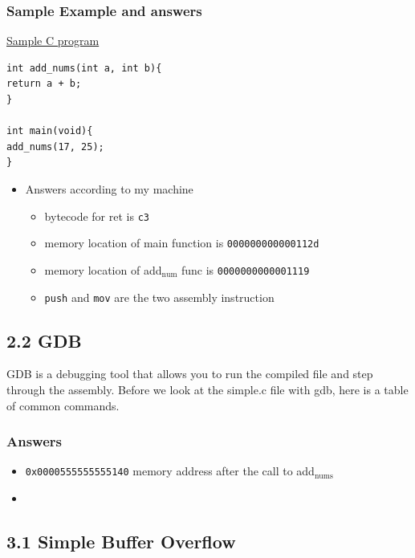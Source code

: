 \documentclass[11pt]{article}
\begin{document}
\subsubsection*{Sample Example and answers}
\label{sec:org05e3846}
\uline{Sample C program}
\begin{verbatim}
int add_nums(int a, int b){
return a + b;
}

int main(void){
add_nums(17, 25);
}
\end{verbatim}
\begin{itemize}
\item Answers according to my machine
\label{sec:org29b98c5}
\begin{itemize}
\item bytecode for ret is \texttt{c3}
\item memory location of main function is \texttt{000000000000112d}
\item memory location of add\(_{\text{num}}\) func is \texttt{0000000000001119}
\item \texttt{push} and \texttt{mov} are the two assembly instruction
\end{itemize}
\end{itemize}

\subsection*{2.2 GDB}
\label{sec:orgcd5e49b}
GDB is a debugging tool that allows you to run the compiled file and step through the assembly. Before we look at the simple.c file with gdb, here is a table of common commands.
\subsubsection*{Answers}
\label{sec:org5cba0cb}
\begin{itemize}
\item \texttt{0x0000555555555140} memory address after the call to add\(_{\text{nums}}\)
\item 
\end{itemize}
\subsection*{3.1 Simple Buffer Overflow}
\label{sec:org221debd}
\end{document}
